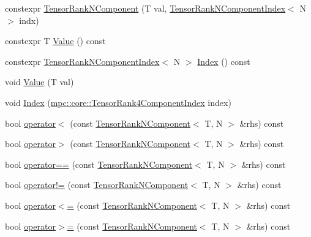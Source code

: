 \begin{DoxyCompactItemize}
\item 
constexpr \mbox{\hyperlink{classmpc_1_1core_1_1_tensor_rank_n_component_a57477ad47a9e4039f314f777bc337488}{Tensor\+Rank\+N\+Component}} (T val, \mbox{\hyperlink{classmpc_1_1core_1_1_tensor_rank_n_component_index}{Tensor\+Rank\+N\+Component\+Index}}$<$ N $>$ indx)
\item 
constexpr T \mbox{\hyperlink{classmpc_1_1core_1_1_tensor_rank_n_component_aed45ac0ca9bbec054d37c2feaa73378a}{Value}} () const
\item 
constexpr \mbox{\hyperlink{classmpc_1_1core_1_1_tensor_rank_n_component_index}{Tensor\+Rank\+N\+Component\+Index}}$<$ N $>$ \mbox{\hyperlink{classmpc_1_1core_1_1_tensor_rank_n_component_a0b54eda033610a20f0c51ab47ea36324}{Index}} () const
\item 
void \mbox{\hyperlink{classmpc_1_1core_1_1_tensor_rank_n_component_a340efa1304773b5074b460795bf70cac}{Value}} (T val)
\item 
void \mbox{\hyperlink{classmpc_1_1core_1_1_tensor_rank_n_component_a5f398096099b3d7c7353bed10a79ad5d}{Index}} (\mbox{\hyperlink{namespacempc_1_1core_a54c081f41b2475abd10182bf023805d2}{mpc\+::core\+::\+Tensor\+Rank4\+Component\+Index}} index)
\item 
bool \mbox{\hyperlink{classmpc_1_1core_1_1_tensor_rank_n_component_a06a52579da1cac23e406fa638f8c31c1}{operator$<$}} (const \mbox{\hyperlink{classmpc_1_1core_1_1_tensor_rank_n_component}{Tensor\+Rank\+N\+Component}}$<$ T, N $>$ \&rhs) const
\item 
bool \mbox{\hyperlink{classmpc_1_1core_1_1_tensor_rank_n_component_aea9710656c2dfba2e031476c9662f937}{operator$>$}} (const \mbox{\hyperlink{classmpc_1_1core_1_1_tensor_rank_n_component}{Tensor\+Rank\+N\+Component}}$<$ T, N $>$ \&rhs) const
\item 
bool \mbox{\hyperlink{classmpc_1_1core_1_1_tensor_rank_n_component_af4daf80199bb73541c8ccee2f41e45e6}{operator==}} (const \mbox{\hyperlink{classmpc_1_1core_1_1_tensor_rank_n_component}{Tensor\+Rank\+N\+Component}}$<$ T, N $>$ \&rhs) const
\item 
bool \mbox{\hyperlink{classmpc_1_1core_1_1_tensor_rank_n_component_aa3e7f1d6e679fe8d4a3f0242f5f20dfd}{operator!=}} (const \mbox{\hyperlink{classmpc_1_1core_1_1_tensor_rank_n_component}{Tensor\+Rank\+N\+Component}}$<$ T, N $>$ \&rhs) const
\item 
bool \mbox{\hyperlink{classmpc_1_1core_1_1_tensor_rank_n_component_a82c62e2f448445e13931a1b64217f582}{operator$<$=}} (const \mbox{\hyperlink{classmpc_1_1core_1_1_tensor_rank_n_component}{Tensor\+Rank\+N\+Component}}$<$ T, N $>$ \&rhs) const
\item 
bool \mbox{\hyperlink{classmpc_1_1core_1_1_tensor_rank_n_component_a03ca8237de6ccde2a7bbdc68fc4712f4}{operator$>$=}} (const \mbox{\hyperlink{classmpc_1_1core_1_1_tensor_rank_n_component}{Tensor\+Rank\+N\+Component}}$<$ T, N $>$ \&rhs) const
\end{DoxyCompactItemize}
